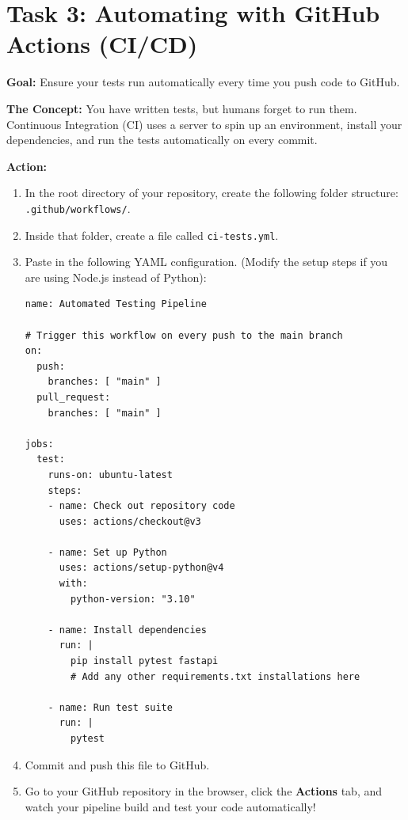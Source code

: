 \documentclass[a4paper,12pt]{article}
\begin{document}

\section*{Task 3: Automating with GitHub Actions (CI/CD)}

\textbf{Goal:} Ensure your tests run automatically every time you push code to GitHub.

\textbf{The Concept:} You have written tests, but humans forget to run them. Continuous Integration (CI) uses a server to spin up an environment, install your dependencies, and run the tests automatically on every commit.

\vspace{0.3cm}
\textbf{Action:}
\begin{enumerate}
    \item In the root directory of your repository, create the following folder structure:\\ \texttt{.github/workflows/}.
    \item Inside that folder, create a file called \texttt{ci-tests.yml}.
    \item Paste in the following YAML configuration. (Modify the setup steps if you are using Node.js instead of Python):
    \begin{verbatim}
name: Automated Testing Pipeline

# Trigger this workflow on every push to the main branch
on:
  push:
    branches: [ "main" ]
  pull_request:
    branches: [ "main" ]

jobs:
  test:
    runs-on: ubuntu-latest
    steps:
    - name: Check out repository code
      uses: actions/checkout@v3

    - name: Set up Python
      uses: actions/setup-python@v4
      with:
        python-version: "3.10"

    - name: Install dependencies
      run: |
        pip install pytest fastapi
        # Add any other requirements.txt installations here

    - name: Run test suite
      run: |
        pytest
    \end{verbatim}
    \item Commit and push this file to GitHub.
    \item Go to your GitHub repository in the browser, click the \textbf{Actions} tab, and watch your pipeline build and test your code automatically!
\end{enumerate}
\end{document}
